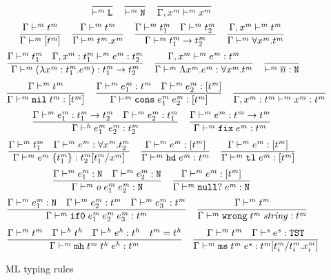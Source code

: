 \begin{figure}[p]
\[
\frac
{}
{ \vdash^{\mathit{m}} \mathtt{L}}
\quad
\frac
{}
{ \vdash^{\mathit{m}} \mathtt{N}}
\quad
\frac
{}
{\Gamma , x^{\mathit{m}} \vdash^{\mathit{m}} x^{\mathit{m}}}
\]
\[
\frac
{\Gamma \vdash^{\mathit{m}} t^{\mathit{m}}}
{\Gamma \vdash^{\mathit{m}} [t^{\mathit{m}}]}
\quad
\frac
{\Gamma \vdash^{\mathit{m}} t^{\mathit{m}}}
{\Gamma \vdash^{\mathit{m}} t^{\mathit{m}} . x^{\mathit{m}}}
\quad
\frac
{\Gamma \vdash^{\mathit{m}} t^{\mathit{m}}_{1} \quad \Gamma \vdash^{\mathit{m}} t^{\mathit{m}}_{2}}
{\Gamma \vdash^{\mathit{m}} t^{\mathit{m}}_{1} \rightarrow t^{\mathit{m}}_{2}}
\quad
\frac
{\Gamma, x^{\mathit{m}} \vdash^{\mathit{m}} t^{\mathit{m}}}
{\Gamma \vdash^{\mathit{m}} \forall x^{\mathit{m}} . t^{\mathit{m}}}
\]
\bigskip
\[
\frac
{\Gamma \vdash^{\mathit{m}} t^{\mathit{m}}_{1} \quad \Gamma , x^{\mathit{m}} : t^{\mathit{m}}_{1} \vdash^{\mathit{m}} e^{\mathit{m}} : t^{\mathit{m}}_{2}}
{\Gamma \vdash^{\mathit{m}} (\lambda x^{\mathit{m}} : t^{\mathit{m}}_{1} . e^{\mathit{m}}) : t^{\mathit{m}}_{1} \rightarrow t^{\mathit{m}}_{2}}
\quad
\frac
{\Gamma , x^{\mathit{m}} \vdash^{\mathit{m}} e^{\mathit{m}} : t^{\mathit{m}}}
{\Gamma \vdash^{\mathit{m}} \Lambda x^{\mathit{m}} . e^{\mathit{m}} : \forall x^{\mathit{m}} . t^{\mathit{m}}}
\quad
\frac
{}
{ \vdash^{\mathit{m}} \overline{n} : \mathtt{N}}
\]
\[
\frac
{\Gamma \vdash^{\mathit{m}} t^{\mathit{m}}}
{\Gamma \vdash^{\mathit{m}} \mathtt{nil} \; t^{\mathit{m}} : [t^{\mathit{m}}]}
\quad
\frac
{\Gamma \vdash^{\mathit{m}} e^{\mathit{m}}_{1} : t^{\mathit{m}} \quad \Gamma \vdash^{\mathit{m}} e^{\mathit{m}}_{2} : [t^{\mathit{m}}]}
{\Gamma \vdash^{\mathit{m}} \mathtt{cons} \; e^{\mathit{m}}_{1} \; e^{\mathit{m}}_{2} : [t^{\mathit{m}}]}
\quad
\frac
{}
{\Gamma , x^{\mathit{m}} : t^{\mathit{m}} \vdash^{\mathit{m}} x^{\mathit{m}} : t^{\mathit{m}}}
\]
\[
\frac
{\Gamma \vdash^{\mathit{m}} e^{\mathit{m}}_{1} : t^{\mathit{m}}_{1} \rightarrow t^{\mathit{m}}_{2} \quad \Gamma \vdash^{\mathit{m}} e^{\mathit{m}}_{2} : t^{\mathit{m}}_{1}}
{\Gamma\vdash^{\mathit{h}}e^{\mathit{m}}_{1} \; e^{\mathit{m}}_{2}:t^{\mathit{m}}_{2}}
\quad
\frac
{\Gamma \vdash^{\mathit{m}} e^{\mathit{m}} : t^{\mathit{m}} \rightarrow t^{\mathit{m}}}
{\Gamma \vdash^{\mathit{m}} \mathtt{fix} \; e^{\mathit{m}} : t^{\mathit{m}}}
\]
\[
\frac
{\Gamma \vdash^{\mathit{m}} t^{\mathit{m}}_{1} \quad \Gamma \vdash^{\mathit{m}} e^{\mathit{m}} : \forall x^{\mathit{m}} . t^{\mathit{m}}_{2}}
{\Gamma \vdash^{\mathit{m}} e^{\mathit{m}} \; \lbrace t^{\mathit{m}}_{1} \rbrace : t^{\mathit{m}}_{2}[t^{\mathit{m}}_{1}/x^{\mathit{m}}]}
\quad
\frac
{\Gamma \vdash^{\mathit{m}} e^{\mathit{m}} : [t^{\mathit{m}}]}
{\Gamma \vdash^{\mathit{m}} \mathtt{hd} \; e^{\mathit{m}} : t^{\mathit{m}}}
\quad
\frac
{\Gamma \vdash^{\mathit{m}} e^{\mathit{m}} : [t^{\mathit{m}}]}
{\Gamma \vdash^{\mathit{m}} \mathtt{tl} \; e^{\mathit{m}} : [t^{\mathit{m}}]}
\]
\[
\frac
{\Gamma \vdash^{\mathit{m}} e^{\mathit{m}}_{1} : \mathtt{N} \quad \Gamma \vdash^{\mathit{m}} e^{\mathit{m}}_{2} : \mathtt{N}}
{\Gamma \vdash^{\mathit{m}} \mathit{o} \; e^{\mathit{m}}_{1} \; e^{\mathit{m}}_{2} : \mathtt{N}}
\quad
\frac
{\Gamma \vdash^{\mathit{m}} e^{\mathit{m}} : [t^{\mathit{m}}]}
{\Gamma \vdash^{\mathit{m}} \mathtt{null?} \; e^{\mathit{m}} : \mathtt{N}}
\]
\[
\frac
{\Gamma \vdash^{\mathit{m}} e^{\mathit{m}}_{1} : \mathtt{N} \quad \Gamma \vdash^{\mathit{m}} e^{\mathit{m}}_{2} : t^{\mathit{m}} \quad \Gamma \vdash^{\mathit{m}} e^{\mathit{m}}_{3} : t^{\mathit{m}}}
{\Gamma \vdash^{\mathit{m}} \mathtt{if0} \; e^{\mathit{m}}_{1} \; e^{\mathit{m}}_{2} \; e^{\mathit{m}}_{3} : t^{\mathit{m}}}
\quad
\frac
{\Gamma \vdash^{\mathit{m}} t^{\mathit{m}}}
{\Gamma \vdash^{\mathit{m}} \mathtt{wrong} \; t^{\mathit{m}} \; \mathit{string} : t^{\mathit{m}}}
\]
\[
\frac
{\Gamma \vdash^{\mathit{m}} t^{\mathit{m}} \quad \Gamma \vdash^{\mathit{h}} t^{\mathit{h}} \quad \Gamma \vdash^{\mathit{h}} e^{\mathit{h}} : t^{\mathit{h}} \quad t^{\mathit{m}}=t^{\mathit{h}}}
{\Gamma \vdash^{\mathit{m}} \mathtt{mh} \; t^{\mathit{m}} \; t^{\mathit{h}} \; e^{\mathit{h}} : t^{\mathit{m}}}
\quad
\frac
{\Gamma \vdash^{\mathit{m}} t^{\mathit{m}} \quad \Gamma \vdash^{\mathit{s}} e^{\mathit{s}} : \mathtt{TST}}
{\Gamma \vdash^{\mathit{m}} \mathtt{ms} \; t^{\mathit{m}} \; e^{\mathit{s}} : t^{\mathit{m}}[t^{\mathit{m}}_{i}/t^{\mathit{m}}_{i} . x^{\mathit{m}}_{i}]}
\]
\caption{ML typing rules}
\label{mtr}
\end{figure}
